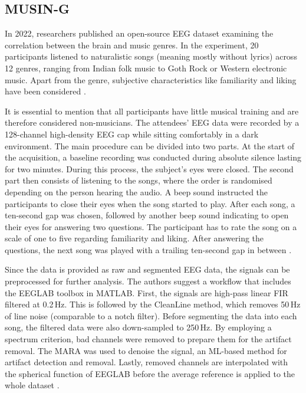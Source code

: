     \subsection{MUSIN-G}
      In 2022, researchers published an open-source \ac{EEG} dataset examining the correlation between the brain and music genres. In the experiment, 20 participants listened to naturalistic songs (meaning mostly without lyrics) across 12 genres, ranging from Indian folk music to Goth Rock or Western electronic music. Apart from the genre, subjective characteristics like familiarity and liking have been considered \cite{miyapuram2022Musing}. \par
      It is essential to mention that all participants have little musical training and are therefore considered non-musicians. The attendees' \ac{EEG} data were recorded by a 128-channel high-density EEG cap while sitting comfortably in a dark environment. The main procedure can be divided into two parts. At the start of the acquisition, a baseline recording was conducted during absolute silence lasting for two minutes. During this process, the subject's eyes were closed. The second part then consists of listening to the songs, where the order is randomised depending on the person hearing the audio. A beep sound instructed the participants to close their eyes when the song started to play. After each song, a ten-second gap was chosen, followed by another beep sound indicating to open their eyes for answering two questions. The participant has to rate the song on a scale of one to five regarding familiarity and liking. After answering the questions, the next song was played with a trailing ten-second gap in between \cite{miyapuram2022Musing}. \par
      Since the data is provided as raw and segmented \ac{EEG} data, the signals can be preprocessed for further analysis. The authors suggest a workflow that includes the EEGLAB toolbox in MATLAB. First, the signals are high-pass linear \ac{FIR} filtered at 0.2\,Hz. This is followed by the CleanLine method, which removes 50\,Hz of line noise (comparable to a notch filter). Before segmenting the data into each song, the filtered data were also down-sampled to 250\,Hz. By employing a spectrum criterion, bad channels were removed to prepare them for the artifact removal. The \ac{MARA} was used to denoise the signal, an \ac{ML}-based method for artifact detection and removal. Lastly, removed channels are interpolated with the spherical function of EEGLAB before the average reference is applied to the whole dataset \cite{miyapuram2022Musing}.


